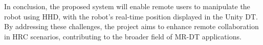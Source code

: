 In conclusion, the proposed system will enable remote users to manipulate the robot using \ac{HHD}, with the robot's real-time position displayed in the Unity \ac{DT}. By addressing these challenges, the project aims to enhance remote collaboration in \ac{HRC} scenarios, contributing to the broader field of \ac{MR}-\ac{DT} applications.









